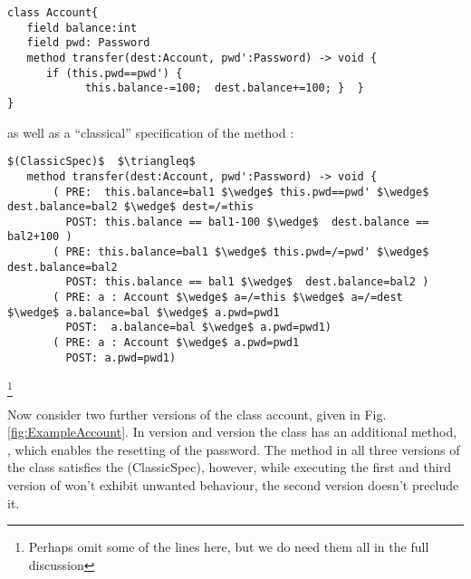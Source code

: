  
\begin{lstlisting}[language=Chainmail]
class Account{
   field balance:int 
   field pwd: Password 
   method transfer(dest:Account, pwd':Password) -> void {
      if (this.pwd==pwd') {
            this.balance-=100;  dest.balance+=100; }  }
}
\end{lstlisting}

as well as a ``classical'' specification of the method :



\begin{lstlisting}[mathescape=true, frame=lines, language=Chainmail]
$(ClassicSpec)$  $\triangleq$
   method transfer(dest:Account, pwd':Password) -> void {
       ( PRE:  this.balance=bal1 $\wedge$ this.pwd==pwd' $\wedge$ dest.balance=bal2 $\wedge$ dest=/=this 
         POST: this.balance == bal1-100 $\wedge$  dest.balance == bal2+100 )
       ( PRE: this.balance=bal1 $\wedge$ this.pwd=/=pwd' $\wedge$ dest.balance=bal2
         POST: this.balance == bal1 $\wedge$  dest.balance=bal2 )
       ( PRE: a : Account $\wedge$ a=/=this $\wedge$ a=/=dest  $\wedge$ a.balance=bal $\wedge$ a.pwd=pwd1
         POST:  a.balance=bal $\wedge$ a.pwd=pwd1)
       ( PRE: a : Account $\wedge$ a.pwd=pwd1  
         POST: a.pwd=pwd1)       
\end{lstlisting}\footnote{Perhaps omit some of the lines here, but we do need them all in the full discussion}
 
  
 
 Now consider two further versions of the class account, given in Fig. \ref{fig:ExampleAccount}.
 In version {} and version {} the class has an additional method, , which enables the resetting of the password.
The method  in all three versions of the class  satisfies the (ClassicSpec), 
however, while executing the first and third version of  won't exhibit unwanted behaviour, the second version doesn't preclude it.
  
%
  
